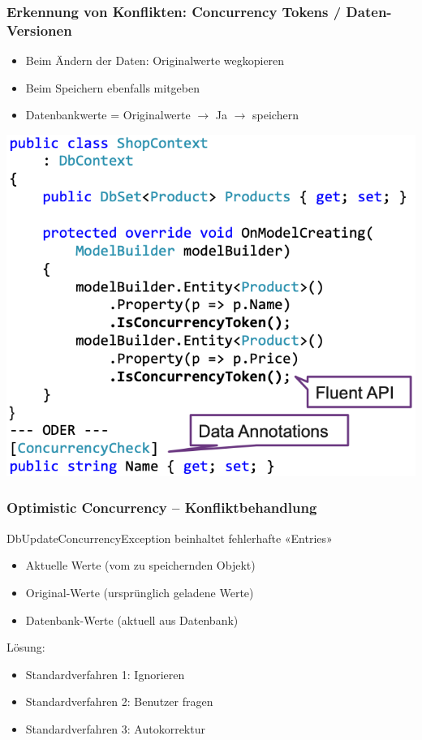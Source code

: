 \subsubsection{Erkennung von Konflikten: Concurrency Tokens / Daten-Versionen}
\begin{itemize}
    \item Beim Ändern der Daten: Originalwerte wegkopieren
    \item Beim Speichern ebenfalls mitgeben
    \item Datenbankwerte = Originalwerte $\rightarrow$ Ja $\rightarrow$ speichern
\end{itemize}
\vspace{-8pt}
\begin{center}
    \includegraphics[scale=.4]{graphic/efc/Concurrency Tokens.png}
\end{center}
\vspace{-8pt}

\subsubsection{Optimistic Concurrency – Konfliktbehandlung}
DbUpdateConcurrencyException beinhaltet fehlerhafte «Entries»
\begin{itemize}
    \item Aktuelle Werte (vom zu speichernden Objekt)
    \item Original-Werte (ursprünglich geladene Werte)
    \item Datenbank-Werte (aktuell aus Datenbank)
\end{itemize}
Lösung:
\begin{itemize}
    \item Standardverfahren 1: Ignorieren
    \item Standardverfahren 2: Benutzer fragen
    \item Standardverfahren 3: Autokorrektur
\end{itemize}


